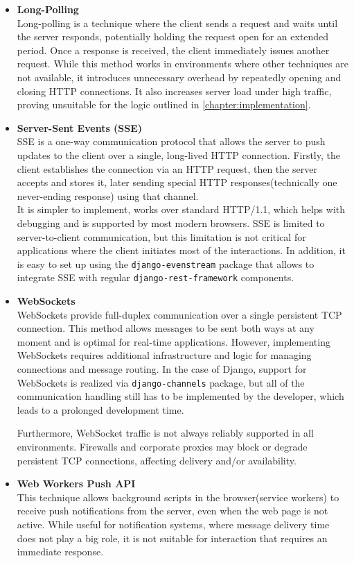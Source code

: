 \begin{itemize}
    \item \textbf{Long-Polling} \\
    Long-polling is a technique where the client sends a request and waits until the server responds,
    potentially holding the request open for an extended period.
    Once a response is received, the client immediately issues another request.
    While this method works in environments where other techniques are not available,
    it introduces unnecessary overhead by repeatedly opening and closing HTTP connections.
    It also increases server load under high traffic, proving unsuitable for the logic outlined
    in \ref{chapter:implementation}.

    \item \textbf{Server-Sent Events (SSE)} \\
    SSE is a one-way communication protocol that allows the server to push updates to the client over a
    single, long-lived HTTP connection. Firstly, the client establishes the connection via an HTTP request, then the
    server accepts and stores it, later sending special HTTP responses(technically one never-ending response) using that channel.\\
    It is simpler to implement, works over standard HTTP/1.1, which helps with debugging
    and is supported by most modern browsers.\cite{sse}
    SSE is limited to server-to-client communication, but this limitation is not critical for applications where the client initiates
    most of the interactions. In addition, it is easy to set up using the
    \texttt{django-evenstream}\cite{django_sse} package that allows to integrate
    SSE with regular \texttt{django-rest-framework} components.

    \item \textbf{WebSockets} \\
    WebSockets provide full-duplex communication over a single persistent TCP connection.
    This method allows messages to be sent both ways at any moment and is optimal for real-time applications\cite{websockets}.
    However, implementing WebSockets requires additional infrastructure and logic for
    managing connections and message routing. In the case of Django, support for WebSockets is realized via
    \texttt{django-channels} package, but all of the communication handling still has to be implemented by the developer,
    which leads to a prolonged development time.

    Furthermore, WebSocket traffic is not always reliably supported in all environments.
    Firewalls and corporate proxies may block or degrade persistent TCP connections,
    affecting delivery and/or availability.

    \item \textbf{Web Workers Push API} \\
    This technique allows background scripts in the browser(service workers) to receive push notifications from the server,
    even when the web page is not active.\cite{pushapi} While useful for notification systems, where message
    delivery time does not play a big role,
    it is not suitable for interaction that requires an immediate response.
\end{itemize}

